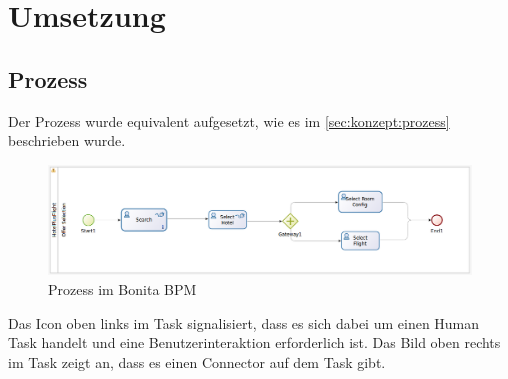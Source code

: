 

\chapter{Umsetzung}
\label{sec:umsetzung}

\section{Prozess}
Der Prozess wurde equivalent aufgesetzt, wie es im \cref{sec:konzept:prozess}  beschrieben wurde.

\begin{figure}[H]
	\centering
	\includegraphics[width=1\textwidth]{images/umsetzung-prozess.png}
	\caption{Prozess im Bonita BPM}
	\label{fig:umsetzung:prozess}
\end{figure}
Das Icon oben links im Task signalisiert, dass es sich dabei um einen Human Task handelt und eine Benutzerinteraktion erforderlich ist. Das Bild oben rechts im Task zeigt an, dass es einen Connector auf dem Task gibt.

